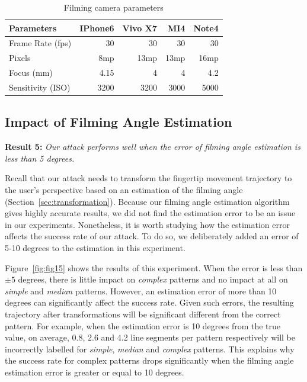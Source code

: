     \begin{table}[!t]
            \centering
            \caption{Filming camera parameters}
            \label{tab:camera-parameters}
            \small
            \begin{tabular}{lrrrr}
                \toprule
                \textbf{Parameters}& \textbf{IPhone6} & \textbf{Vivo X7} & \textbf{MI4} & \textbf{Note4} \\
                \midrule
                Frame Rate (fps) & $30$ & $30$& $30$ & 30 \\
                Pixels & 8mp & 13mp & 13mp & 16mp \\
                Focus (mm) & 4.15 & 4 & 4 & 4.2 \\
                Sensitivity (ISO) & 3200 & 3200 & 3000 & 5000 \\
                \bottomrule
            \end{tabular}
    \end{table}

    \subsection{Impact of Filming Angle Estimation \label{sec:angle}}

    \noindent \textbf{Result 5:} \emph{Our attack performs well when the error of filming angle estimation is less than 5 degrees.}

   Recall that our attack needs to transform the fingertip movement trajectory to the
   user's perspective based on an estimation of the filming angle
   (Section~\ref{sec:transformation}).
   Because our filming angle estimation
    algorithm gives highly accurate results, we did not find the estimation error to be an issue in our experiments.
   Nonetheless, it is worth studying how the estimation error affects the success rate of our attack. To do so, we deliberately added an error of 5-10 degrees to the estimation in this experiment.

    Figure~\ref{fig:fig15} shows the results of this experiment. When the error is less than $\pm 5$ degrees, there is little impact
    on \emph{complex} patterns and no impact at all on \emph{simple} and
    \emph{median} patterns. However, an estimation error of more than 10 degrees can significantly affect the success rate.
    Given such errors, the resulting trajectory after transformations will
    be significant different from the correct pattern.
    For example, when the estimation error is 10 degrees from the
    true value,  on average, 0.8, 2.6 and 4.2 line segments per pattern respectively will
    be incorrectly labelled for \emph{simple}, \emph{median} and
    \emph{complex} patterns. This explains why the success rate for complex patterns drops significantly when the filming angle estimation error is greater or equal to 10 degrees.

